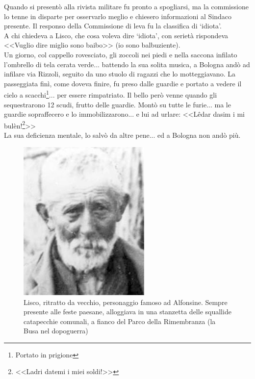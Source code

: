 \indent Quando si presentò alla rivista militare fu pronto a spogliarsi, ma la commissione lo tenne in disparte per osservarlo meglio e chiesero informazioni al Sindaco presente. Il responso della Commissione di leva fu la classifica di `idiota'.\\
\indent A chi chiedeva a Lisco, che cosa voleva dire `idiota', con serietà rispondeva <<Vuglio dire miglio sono baibo>> (io sono balbuziente).\\
\indent Un giorno, col cappello rovesciato, gli zoccoli nei piedi e nella saccona infilato l'ombrello di tela cerata verde... battendo la sua solita musica, a Bologna andò ad infilare via Rizzoli, seguito da uno stuolo di ragazzi che lo motteggiavano. La passeggiata finì, come doveva finire, fu preso dalle guardie e portato a vedere il cielo a scacchi\footnote{Portato in prigione}... per essere rimpatriato. Il bello però venne quando gli sequestrarono 12 scudi, frutto delle guardie. Montò su tutte le furie... ma le guardie sopraffecero e lo immobilizzarono... e lui ad urlare: <<Lêdar dasim i mi bulèn!\footnote{<<Ladri datemi i miei soldi!>>}>>\\
\indent La sua deficienza mentale, lo salvò da altre pene... ed a Bologna non andò più.\\

 \begin{figure}[htb]
    \centering
    \includegraphics[height=8cm]{Lisco}
    \caption*{Lisco, ritratto da vecchio, personaggio famoso ad Alfonsine. Sempre presente alle feste paesane, alloggiava in una stanzetta delle squallide catapecchie comunali, a fianco del Parco della Rimembranza (la Busa nel dopoguerra)\label{fig:Lisco}}
\end{figure}



